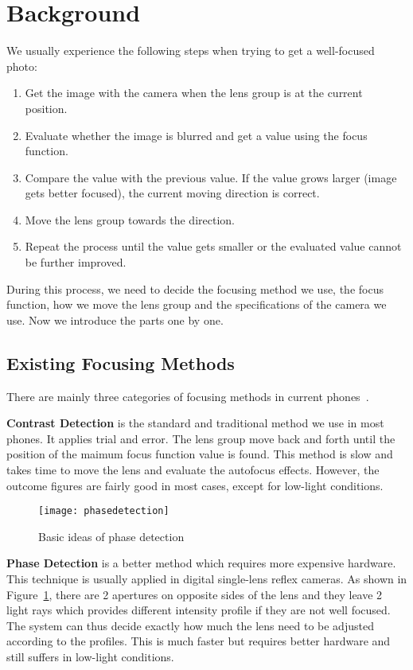 \section{Background}

We usually experience the following steps when trying to get a well-focused photo:
\begin{enumerate}
	\item Get the image with the camera when the lens group is at the current position.
	\item Evaluate whether the image is blurred and get a value using the focus function.
	\item Compare the value with the previous value. If the value grows larger (image gets better focused), the current moving direction is correct.
	\item Move the lens group towards the direction.
	\item Repeat the process until the value gets smaller or the evaluated value cannot be further improved.
\end{enumerate}

During this process, we need to decide the focusing method we use, the focus function, how we move the lens group and the specifications of the camera we use.
Now we introduce the parts one by one.

\subsection{Existing Focusing Methods}
There are mainly three categories of focusing methods in current phones~\cite{autofocus}.

\textbf{Contrast Detection} is the standard and traditional method we use in most phones.
It applies trial and error.
The lens group move back and forth until the position of the maimum focus function value is found.
This method is slow and takes time to move the lens and evaluate the autofocus effects.
However, the outcome figures are fairly good in most cases, except for low-light conditions.

\begin{figure}[tb!]
	\begin{center}
		\texttt{[image: phasedetection]}
	\end{center}
	\caption{Basic ideas of phase detection}
	\label{f:phasedetection}
\end{figure}

\textbf{Phase Detection} is a better method which requires more expensive hardware.
This technique is usually applied in digital single-lens reflex cameras.
As shown in Figure~\ref{f:phasedetection}, there are 2 apertures on opposite sides of the lens and they leave 2 light rays which provides different intensity profile if they are not well focused.
The system can thus decide exactly how much the lens need to be adjusted according to the profiles.
This is much faster but requires better hardware and still suffers in low-light conditions.

